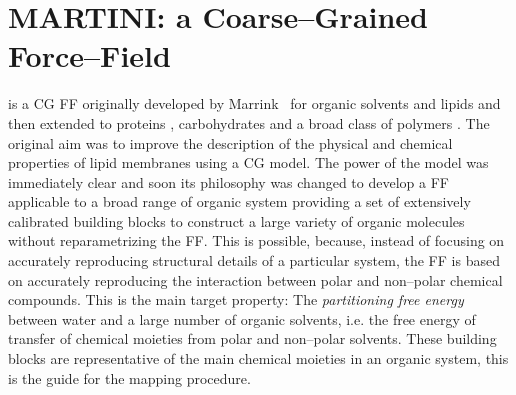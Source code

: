 \section{MARTINI: a Coarse--Grained Force--Field}
\martini is a \ac{CG} \ac{FF} originally developed by Marrink \etal\, \cite{Martini} for organic solvents and lipids and then extended to proteins \cite{MartiniProtein}, carbohydrates \cite{MartiniCarbo} and a broad class of polymers \cite{MartiniPolymers}. The original aim was to improve the description of the physical and chemical properties of lipid membranes using a \ac{CG} model. The power of the model was immediately clear and soon its philosophy was changed to develop a \ac{FF} applicable to a broad range of organic system providing a set of extensively calibrated building blocks to construct a large variety of organic molecules without reparametrizing the \ac{FF}. This is possible, because, instead of focusing on accurately reproducing structural details of a particular system, the \ac{FF} is based on accurately reproducing the interaction between polar and non--polar chemical compounds. This is the main target property: The \textit{partitioning free energy} between water and a large number of organic solvents, i.e. the free energy of transfer of chemical moieties from polar and non--polar solvents. These building blocks are representative of the main chemical moieties in an organic system, this is the guide for the mapping procedure.

